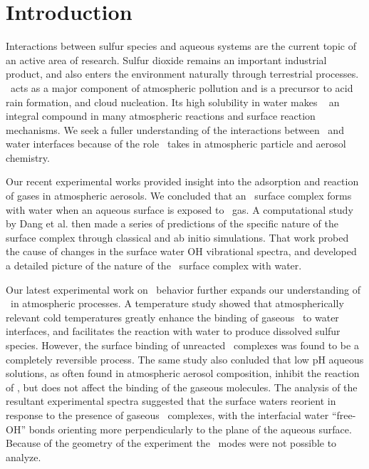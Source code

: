 \section{Introduction}

Interactions between sulfur species and aqueous systems are the current topic of an active area of research. Sulfur dioxide remains an important industrial product, and also enters the environment naturally through terrestrial processes. \suldiox~acts as a major component of atmospheric pollution and is a precursor to acid rain formation, and cloud nucleation. Its high solubility in water makes \suldiox~ an integral compound in many atmospheric reactions and surface reaction mechanisms. We seek a fuller understanding of the interactions between \suldiox~and water interfaces because of the role \suldiox~takes in atmospheric particle and aerosol chemistry.

Our recent experimental works provided insight into the adsorption and reaction of gases in atmospheric aerosols. We concluded that an \suldiox~surface complex forms with water when an aqueous surface is exposed to \suldiox~gas. A computational study by Dang et al.\cite{Baer2010} then made a series of predictions of the specific nature of the surface complex through classical and ab initio simulations. That work probed the cause of changes in the surface water OH vibrational spectra, and developed a detailed picture of the nature of the \suldiox~surface complex with water.

Our latest experimental work on \suldiox~behavior further expands our understanding of \suldiox~in atmospheric processes.\cite{Ota2011} A temperature study showed that atmospherically relevant cold temperatures greatly enhance the binding of gaseous \suldiox~to water interfaces, and facilitates the reaction with water to produce dissolved sulfur species. However, the surface binding of unreacted \suldiox~complexes was found to be a completely reversible process. The same study also conluded that low pH aqueous solutions, as often found in atmospheric aerosol composition, inhibit the reaction of \suldiox, but does not affect the binding of the gaseous molecules. The analysis of the resultant experimental spectra suggested that the surface waters reorient in response to the presence of gaseous \suldiox~complexes, with the interfacial water ``free-OH'' bonds orienting more perpendicularly to the plane of the aqueous surface. Because of the geometry of the experiment the \suldiox~modes were not possible to analyze.

